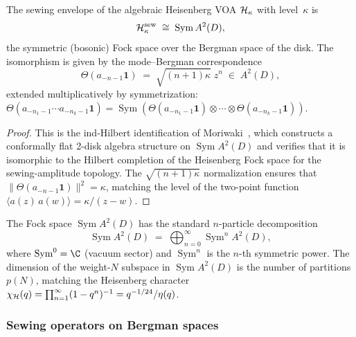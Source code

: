 \begin{proposition}[Heisenberg sewing envelope = $\operatorname{Sym} A^2(D)$;
\ClaimStatusProvedElsewhere{} Moriwaki~\cite{Moriwaki26b}]%
\label{prop:thqg-X-heisenberg-sewing-envelope}%
%
%
The sewing envelope of the algebraic Heisenberg VOA
$\mathcal{H}_\kappa$ with level~$\kappa$ is
\begin{equation}\label{eq:thqg-X-heisenberg-sew}
\mathcal{H}_\kappa^{\mathrm{sew}}
\;\cong\;
\operatorname{Sym} A^2(D),
\end{equation}
the symmetric (bosonic) Fock space over the Bergman space of
the disk. The isomorphism is given by the mode--Bergman
correspondence
\begin{equation}\label{eq:thqg-X-mode-bergman-map}
\Theta(a_{-n-1}\mathbf{1})
\;=\;
\sqrt{(n+1)\kappa}\; z^n
\;\in\; A^2(D),
\end{equation}
extended multiplicatively by symmetrization:
$\Theta(a_{-n_1-1} \cdots a_{-n_k-1}\mathbf{1})
= \operatorname{Sym}(\Theta(a_{-n_1-1}\mathbf{1})
\otimes \cdots \otimes
\Theta(a_{-n_k-1}\mathbf{1}))$.
\end{proposition}

\begin{proof}
This is the ind-Hilbert identification of
Moriwaki~\cite{Moriwaki26b}, which constructs a conformally
flat 2-disk algebra structure on $\operatorname{Sym} A^2(D)$
and verifies that it is isomorphic to the Hilbert completion
of the Heisenberg Fock space for the sewing-amplitude topology.
The $\sqrt{(n+1)\kappa}$ normalization ensures that
$\|\Theta(a_{-n-1}\mathbf{1})\|^2 = \kappa$, matching the
level of the two-point function
$\langle a(z)\,a(w)\rangle = \kappa/(z-w)$.
\end{proof}

\begin{remark}%
\label{rem:thqg-X-tensor-sewing}%
The Fock space $\operatorname{Sym} A^2(D)$ has the standard
$n$-particle decomposition
\[
\operatorname{Sym} A^2(D)
\;=\;
\bigoplus_{n=0}^{\infty}
\operatorname{Sym}^n A^2(D),
\]
where $\operatorname{Sym}^0 = \C$ (vacuum sector) and
$\operatorname{Sym}^n$ is the $n$-th symmetric power.
The dimension of the weight-$N$ subspace in
$\operatorname{Sym} A^2(D)$ is the number of partitions
$p(N)$, matching the Heisenberg character
$\chi_{\mathcal{H}}(q) = \prod_{n=1}^{\infty}(1-q^n)^{-1}
= q^{-1/24}/\eta(q)$.
\end{remark}

\subsubsection{Sewing operators on Bergman spaces}

